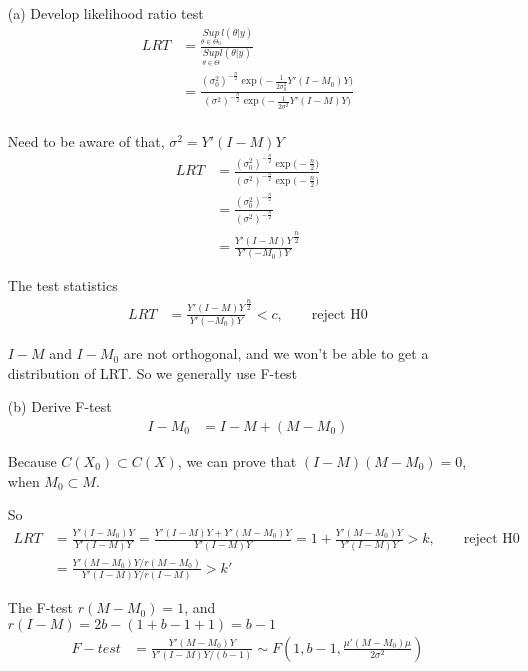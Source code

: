  \begin{itemize}
 \item[(a)] Develop likelihood ratio test
\begin{align*}
 LRT &= \frac{\underset{\theta \in \Theta_0}{Sup} l(\theta| y)}{\underset{\theta \in \Theta}{Sup} l(\theta| y)} \\
 &= \frac{(\sigma_0^2)^{-\frac{n}{2}} \exp \Big(-\frac{1}{2 \sigma_0^2} Y' (I-M_0) Y \Big) }{(\sigma^2)^{-\frac{n}{2}} \exp \Big(-\frac{1}{2 \sigma^2} Y' (I-M) Y \Big) }\\
 \end{align*}
 
 Need to be aware of that, $\sigma^2 =Y' (I-M) Y $
 \begin{align*}
 LRT &=  \frac{(\sigma_0^2)^{-\frac{n}{2}} \exp \Big(-\frac{n}{2}  \Big) }{(\sigma^2)^{-\frac{n}{2}} \exp \Big(-\frac{n}{2 }  \Big) }\\
 &=  \frac{(\sigma_0^2)^{-\frac{n}{2}}  }{(\sigma^2)^{-\frac{n}{2}} }\\
 &=  \frac{Y'(I-M)Y  }{Y'(-M_0) Y}^{\frac{n}{2}}
 \end{align*}
 
 The test statistics
  \begin{align*}
  LRT &=  \frac{Y'(I-M)Y  }{Y'(-M_0) Y}^{\frac{n}{2}} < c, \qquad \text{reject H0}
 \end{align*}
 
 $I-M$ and $I-M_0$ are not orthogonal, and we won't be able to get a distribution of LRT. So we generally use F-test
 
 
 \item[(b)] Derive F-test
   \begin{align*}
  I- M_0 &=  I-M + (M-M_0)
 \end{align*}
 
 Because $C(X_0) \subset C(X)$, we can prove that $(I-M) (M-M_0) = 0$, when $M_0 \subset M$. 
 
 So 
 \begin{align*}
 LRT &=  \frac{Y'(I-M_0) Y}{Y'(I-M)Y} =  \frac{Y'(I-M) Y + Y'(M - M_0) Y}{Y'(I-M)Y} = 1 + \frac{Y'(M - M_0) Y}{Y'(I-M)Y} > k , \qquad \text{reject H0}\\
 &= \frac{Y'(M - M_0) Y \Bigg / r(M-M_0)}{Y'(I-M)Y \Bigg / r(I-M)} > k'
 \end{align*}
 
 The F-test $ r(M-M_0) = 1$, and $r(I-M) = 2b - (1 + b-1 + 1) = b-1$
  \begin{align*}
 F-test &= \frac{Y'(M - M_0) Y }{Y'(I-M)Y \Bigg / (b-1)} \sim F(1, b-1, \frac{\mu' (M-M_0) \mu}{2 \sigma^2}) 
 \end{align*}
 

\end{itemize}
